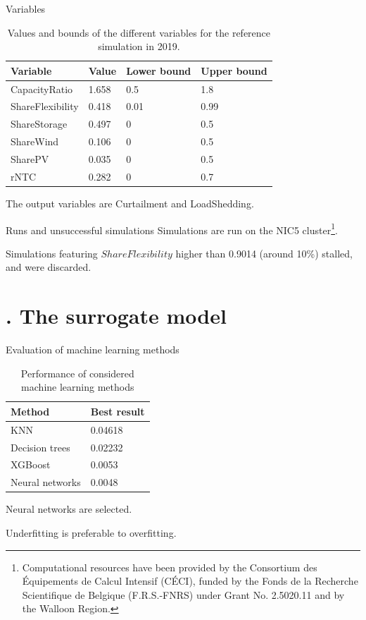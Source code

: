 \documentclass{beamer}
\newcommand{\mysection}[1]{\section{\thesection. #1}}
\begin{document}
    \begin{frame}{Variables}
        \begin{table}[h]
            \centering
            \begin{tabular}{|l l l l|}
                \hline
                Variable         & Value  & Lower bound & Upper bound \\ \hline
                CapacityRatio    & 1.658  & 0.5         & 1.8         \\
                ShareFlexibility & 0.418  & 0.01        & 0.99        \\
                ShareStorage     & 0.497  & 0           & 0.5         \\
                ShareWind        & 0.106  & 0           & 0.5         \\
                SharePV          & 0.035  & 0           & 0.5         \\
                rNTC             & 0.282  & 0           & 0.7         \\ \hline
            \end{tabular}
            \caption{Values and bounds of the different variables for the reference simulation in 2019.}
            \label{table:reference-values}
        \end{table}
        The output variables are Curtailment and LoadShedding.
    \end{frame}

    \begin{frame}{Runs and unsuccessful simulations}
        Simulations are run on the NIC5 cluster\footnote{Computational resources have been provided by the Consortium des Équipements de Calcul Intensif (CÉCI), funded by the Fonds de la Recherche Scientifique de Belgique (F.R.S.-FNRS) under Grant No. 2.5020.11 and by the Walloon Region.}.
        
        Simulations featuring $ShareFlexibility$ higher than 0.9014 (around 10\%) stalled, and were discarded. 
    \end{frame}

    \mysection{The surrogate model}

    \begin{frame}{Evaluation of machine learning methods}
        \begin{table}
            \centering
            \begin{tabular}{|l l|}
                \hline
                Method & Best result \\ \hline
                KNN    & 0.04618 \\
                Decision trees & 0.02232 \\
                XGBoost & 0.0053 \\
                Neural networks & 0.0048 \\ \hline
            \end{tabular}
            \caption{Performance of considered machine learning methods}
        \end{table}
        Neural networks are selected.

        Underfitting is preferable to overfitting.
    \end{frame}
\end{document}
